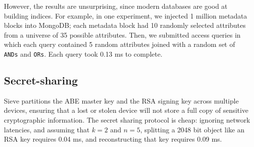 However, the results
are unsurprising, since modern databases are good
at building indices. For example, in one experiment,
we injected 1 million metadata blocks into MongoDB;
each metadata block had 10 randomly selected attributes
from a universe of 35 possible attributes. Then, we
submitted access queries in which each query contained
5 random attributes joined with a random set of
\texttt{ANDs} and \texttt{ORs}. Each query took 0.13 ms
to complete.

\subsection{Secret-sharing} Sieve partitions the
ABE master key and the RSA signing key across
multiple devices, ensuring that a lost or stolen
device will not store a full copy of sensitive
cryptographic information. The secret sharing
protocol is cheap: ignoring network latencies,
and assuming that $k=2$ and $n=5$,
splitting a 2048 bit object like an RSA key
requires 0.04 ms, and reconstructing that key
requires 0.09 ms.
